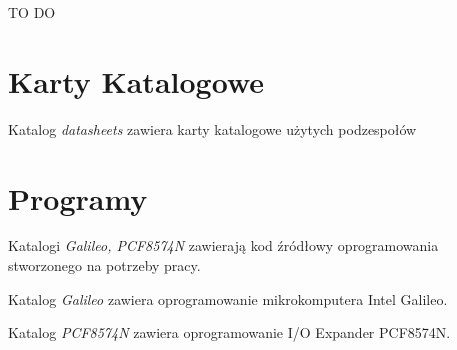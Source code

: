 \documentclass{xmgr}
\begin{document}
\summary
TO DO

\appendix
\chapter{Karty Katalogowe}
Katalog \emph{datasheets} zawiera karty katalogowe użytych podzespołów
\chapter{Programy}
Katalogi \emph{Galileo, PCF8574N} zawierają kod źródłowy oprogramowania stworzonego na potrzeby pracy. 

\noindent Katalog \emph{Galileo} zawiera oprogramowanie mikrokomputera Intel\cite{einstein} Galileo.

\noindent Katalog \emph{PCF8574N} zawiera oprogramowanie I/O Expander PCF8574N.




\listoftables

\listoffigures

\oswiadczenie
\end{document}
